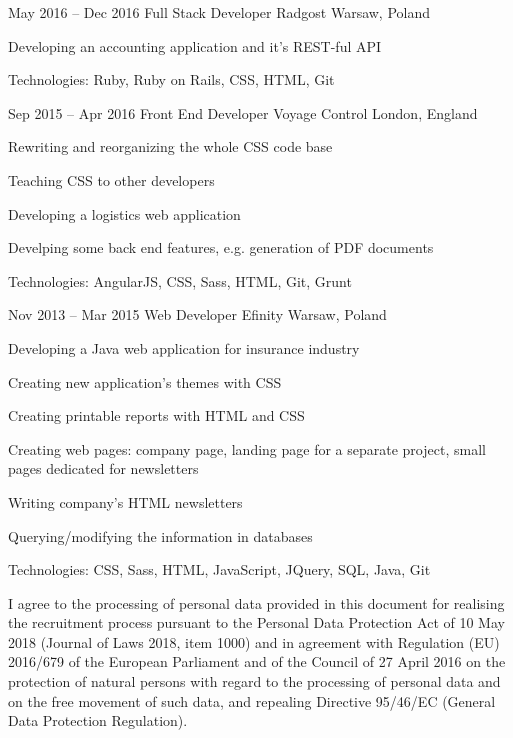 \begin{sectionlist}
    \sectionlistitemjob
        {May 2016 -- Dec 2016}
        {Full Stack Developer}
        {Radgost}
        {Warsaw, Poland}
        {
            \begin{joblisting}
                \item Developing an accounting application and it's REST-ful
                    API
                \item Technologies: Ruby, Ruby on Rails, CSS, HTML, Git
            \end{joblisting}
        }

    \sectionlistitemjob
        {Sep 2015 -- Apr 2016}
        {Front End Developer}
        {Voyage Control}
        {London, England}
        {
            \begin{joblisting}
                \item Rewriting and reorganizing the whole CSS code base
                \item Teaching CSS to other developers
                \item Developing a logistics web application
                \item Develping some back end features, e.g. generation of PDF
                    documents
                \item Technologies: AngularJS, CSS, Sass, HTML, Git, Grunt
            \end{joblisting}
        }

    \sectionlistitemjob
        {Nov 2013 -- Mar 2015}
        {Web Developer}
        {Efinity}
        {Warsaw, Poland}
        {
            \begin{joblisting}
                \item Developing a Java web application for insurance industry
                \item Creating new application's themes with CSS
                \item Creating printable reports with HTML and CSS
                \item Creating web pages: company page, landing page for a separate project, small pages dedicated for newsletters
                \item Writing company's HTML newsletters
                \item Querying/modifying the information in databases
                \item Technologies: CSS, Sass, HTML, JavaScript, JQuery,
                    SQL, Java, Git
            \end{joblisting}
        }

\end{sectionlist}

\vspace*{\fill}
\small
I agree to the processing of personal data provided in this document for
realising the recruitment process pursuant to the Personal Data Protection
Act of 10 May 2018 (Journal of Laws 2018, item 1000) and in agreement with
Regulation (EU) 2016/679 of the European Parliament and of the Council of 27
April 2016 on the protection of natural persons with regard to the
processing of personal data and on the free movement of such data, and
repealing Directive 95/46/EC (General Data Protection Regulation).
